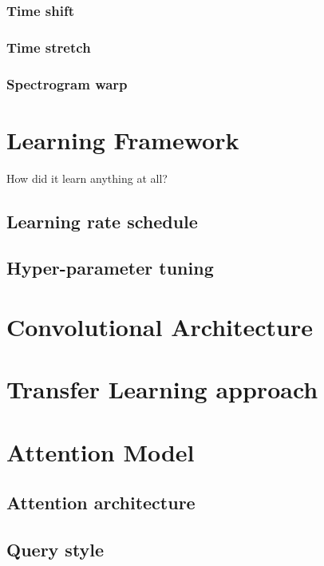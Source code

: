 \subsubsection{Time shift}

\subsubsection{Time stretch}

\subsubsection{Spectrogram warp}

\section{Learning Framework}
\label{sec:learning_framework}

How did it learn anything at all?

\subsection{Learning rate schedule}

\subsection{Hyper-parameter tuning}

\section{Convolutional Architecture}
\label{sec:convolutional_arch}

\section{Transfer Learning approach}
\label{sec:transfer_learning}

\section{Attention Model}
\label{sec:attention_model}

\subsection{Attention architecture}

\subsection{Query style}
